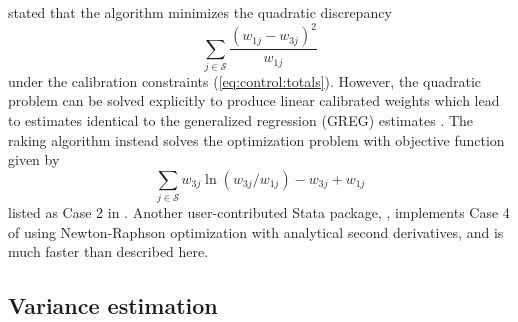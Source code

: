 \citet{deming:stephan:1940} stated that the algorithm minimizes the quadratic
discrepancy
$$
    \sum_{j \in \mathcal{S}} \frac{ (w_{1j}-w_{3j})^2}{w_{1j}}
$$
under the calibration constraints (\ref{eq:control:totals}).
However, the quadratic problem can be solved explicitly to
produce linear calibrated weights which lead to estimates
identical to the generalized regression (GREG) estimates
\citep[Case 1]{deville:sarndal:1992}. The raking algorithm instead solves
the optimization problem with objective function given by
\begin{equation}
    \sum_{j \in \mathcal{S}} w_{3j} \ln( w_{3j}/w_{1j}) - w_{3j} + w_{1j}
    \label{eq:raking:discrepancy}
\end{equation}
listed as Case 2 in  \citet{deville:sarndal:1992}.
Another user-contributed Stata package, 
\citep{wittenberg:2010}, implements Case 4 of \citet{deville:sarndal:1992} using
Newton-Raphson optimization with analytical second derivatives,
and is much faster than  described here.

\subsection{Variance estimation}
\label{subsec:variance}

